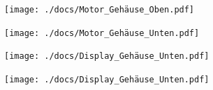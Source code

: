 \documentclass[11pt, titlepage, fleqn]{report}
\begin{document}
		\newpage
		\addtocounter{section}{1}
		\label{sec:TechDraws}
			\begin{landscape}
				\texttt{[image: ./docs/Motor\_Gehäuse\_Oben.pdf]}
			\end{landscape}
			\begin{landscape}
				\texttt{[image: ./docs/Motor\_Gehäuse\_Unten.pdf]}
			\end{landscape}
			\begin{landscape}
				\texttt{[image: ./docs/Display\_Gehäuse\_Unten.pdf]}
			\end{landscape}
			\begin{landscape}
				\texttt{[image: ./docs/Display\_Gehäuse\_Unten.pdf]}
			\end{landscape}
\end{document}
